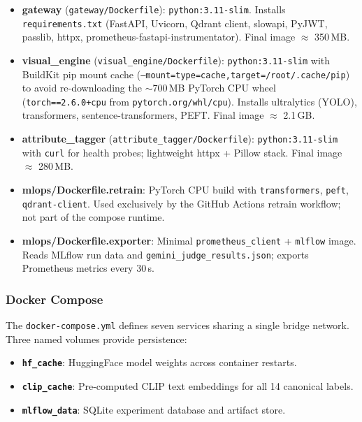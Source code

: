 \documentclass[12pt]{article}
\begin{document}
\begin{itemize}[leftmargin=*]
  \item \textbf{gateway} (\texttt{gateway/Dockerfile}): \texttt{python:3.11-slim}. Installs \texttt{requirements.txt} (FastAPI, Uvicorn, Qdrant client, slowapi, PyJWT, passlib, httpx, prometheus-fastapi-instrumentator). Final image $\approx$ 350\,MB.
  \item \textbf{visual\_engine} (\texttt{visual\_engine/Dockerfile}): \texttt{python:3.11-slim} with BuildKit pip mount cache (\texttt{--mount=type=cache,target=/root/.cache/pip}) to avoid re-downloading the $\sim$700\,MB PyTorch CPU wheel (\texttt{torch==2.6.0+cpu} from \texttt{pytorch.org/whl/cpu}). Installs ultralytics (YOLO), transformers, sentence-transformers, PEFT. Final image $\approx$ 2.1\,GB.
  \item \textbf{attribute\_tagger} (\texttt{attribute\_tagger/Dockerfile}): \texttt{python:3.11-slim} with \texttt{curl} for health probes; lightweight httpx + Pillow stack. Final image $\approx$ 280\,MB.
  \item \textbf{mlops/Dockerfile.retrain}: PyTorch CPU build with \texttt{transformers}, \texttt{peft}, \texttt{qdrant-client}. Used exclusively by the GitHub Actions retrain workflow; not part of the compose runtime.
  \item \textbf{mlops/Dockerfile.exporter}: Minimal \texttt{prometheus\_client} + \texttt{mlflow} image. Reads MLflow run data and \texttt{gemini\_judge\_results.json}; exports Prometheus metrics every 30\,s.
\end{itemize}

\subsubsection{Docker Compose}

The \texttt{docker-compose.yml} defines seven services sharing a single bridge network. Three named volumes provide persistence:

\begin{itemize}[leftmargin=*]
  \item \textbf{\texttt{hf\_cache}}: HuggingFace model weights across container restarts.
  \item \textbf{\texttt{clip\_cache}}: Pre-computed CLIP text embeddings for all 14 canonical labels.
  \item \textbf{\texttt{mlflow\_data}}: SQLite experiment database and artifact store.
\end{itemize}
\end{document}
